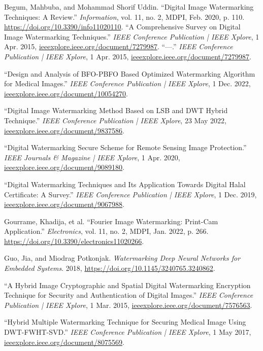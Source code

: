 \documentclass[conference]{IEEEtran}
\begin{document}
\begin{thebibliography}{00}
 Begum, Mahbuba, and Mohammad Shorif Uddin. “Digital Image Watermarking Techniques: A Review.” \textit{Information}, vol. 11, no. 2, MDPI, Feb. 2020, p. 110. \url{https://doi.org/10.3390/info11020110}.
 “A Comprehensive Survey on Digital Image Watermarking Techniques.” \textit{IEEE Conference Publication | IEEE Xplore}, 1 Apr. 2015, \url{ieeexplore.ieee.org/document/7279987}.
 “---.” \textit{IEEE Conference Publication | IEEE Xplore}, 1 Apr. 2015, \url{ieeexplore.ieee.org/document/7279987}.

 “Design and Analysis of BFO-PBFO Based Optimized Watermarking Algorithm for Medical Images.” \textit{IEEE Conference Publication | IEEE Xplore}, 1 Dec. 2022, \url{ieeexplore.ieee.org/document/10054270}.

 “Digital Image Watermarking Method Based on LSB and DWT Hybrid Technique.” \textit{IEEE Conference Publication | IEEE Xplore}, 23 May 2022, \url{ieeexplore.ieee.org/document/9837586}.

 “Digital Watermarking Secure Scheme for Remote Sensing Image Protection.” \textit{IEEE Journals & Magazine | IEEE Xplore}, 1 Apr. 2020, \url{ieeexplore.ieee.org/document/9089180}.

 “Digital Watermarking Techniques and Its Application Towards Digital Halal Certificate: A Survey.” \textit{IEEE Conference Publication | IEEE Xplore}, 1 Dec. 2019, \url{ieeexplore.ieee.org/document/9067988}.

 Gourrame, Khadija, et al. “Fourier Image Watermarking: Print-Cam Application.” \textit{Electronics}, vol. 11, no. 2, MDPI, Jan. 2022, p. 266. \url{https://doi.org/10.3390/electronics11020266}.

 Guo, Jia, and Miodrag Potkonjak. \textit{Watermarking Deep Neural Networks for Embedded Systems}. 2018, \url{https://doi.org/10.1145/3240765.3240862}.

 “A Hybrid Image Cryptographic and Spatial Digital Watermarking Encryption Technique for Security and Authentication of Digital Images.” \textit{IEEE Conference Publication | IEEE Xplore}, 1 Mar. 2015, \url{ieeexplore.ieee.org/document/7576563}.

 “Hybrid Multiple Watermarking Technique for Securing Medical Image Using DWT-FWHT-SVD.” \textit{IEEE Conference Publication | IEEE Xplore}, 1 May 2017, \url{ieeexplore.ieee.org/document/8075569}.


\end{thebibliography}
\end{document}
